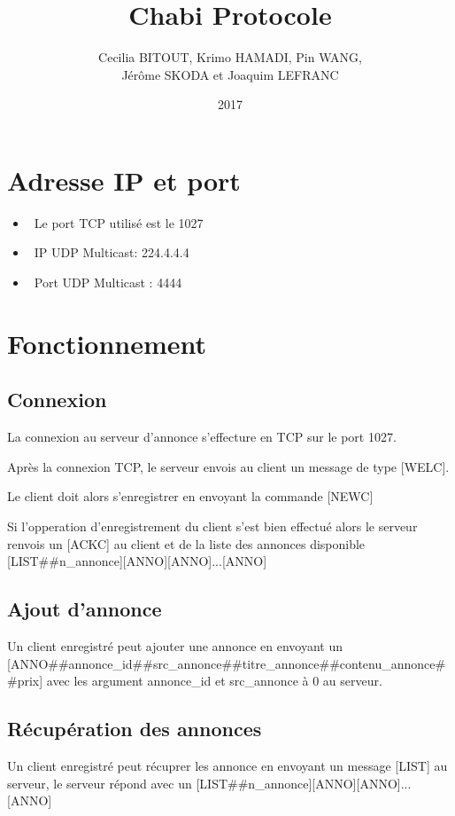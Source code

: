 \documentclass[12pt]{article}
\title{Chabi Protocole}
\author{
  Cecilia BITOUT, Krimo HAMADI, Pin WANG, \\
  Jérôme SKODA et Joaquim LEFRANC
}
\date{2017}
\begin{document}
\maketitle

\section{Adresse IP et port}

\begin{itemize}
  \item~Le port TCP utilisé est le 1027
  \item~IP UDP Multicast: 224.4.4.4
  \item~Port UDP Multicast : 4444
\end{itemize}


\section{Fonctionnement}

\subsection{Connexion}

La connexion au serveur d'annonce s'effecture en TCP sur le port 1027.

Après la connexion TCP, le serveur envois au client un message de type [WELC].

Le client doit alors s'enregistrer en envoyant la commande [NEWC]

Si l'opperation d'enregistrement du client s'est bien effectué alors le serveur renvois un [ACKC] au client et de la liste des annonces disponible [LIST\#\#n\_annonce][ANNO][ANNO]...[ANNO]


\subsection{Ajout d'annonce}

Un client enregistré peut ajouter une annonce en envoyant un [ANNO\#\#annonce\_id\#\#src\_annonce\#\#titre\_annonce\#\#contenu\_annonce\#\#prix] avec les argument annonce\_id et src\_annonce à 0 au serveur.


\subsection{Récupération des annonces}

Un client enregistré peut récuprer les annonce en envoyant un message [LIST] au serveur, le serveur répond avec un [LIST\#\#n\_annonce][ANNO][ANNO]...[ANNO]
\end{document}
